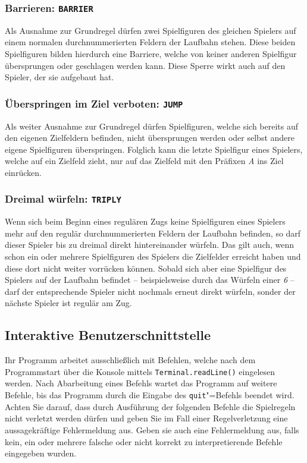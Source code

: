 \subsubsection*{Barrieren: \texttt{BARRIER}} 
Als Ausnahme zur Grundregel dürfen zwei Spielfiguren des gleichen Spielers auf einem normalen durchnummerierten Feldern der Laufbahn stehen. Diese beiden Spielfiguren bilden hierdurch eine Barriere, welche von keiner anderen Spielfigur übersprungen oder geschlagen werden kann. Diese Sperre wirkt auch auf den Spieler, der sie aufgebaut hat.

\subsubsection*{Überspringen im Ziel verboten: \texttt{JUMP}} 
Als weiter Ausnahme zur Grundregel dürfen Spielfiguren, welche sich bereits auf den eigenen Zielfeldern befinden, nicht übersprungen werden oder selbst andere eigene Spielfiguren überspringen. Folglich kann die letzte Spielfigur eines Spielers, welche auf ein Zielfeld zieht, nur auf das Zielfeld mit den Präfixen \emph{A} ins Ziel einrücken.

\subsubsection*{Dreimal würfeln: \texttt{TRIPLY}}
Wenn sich beim Beginn eines regulären Zugs keine Spielfiguren eines Spielers mehr auf den regulär durchnummerierten Feldern der Laufbahn befinden, so darf dieser Spieler bis zu dreimal direkt hintereinander würfeln. Das gilt auch, wenn schon ein oder mehrere Spielfiguren des Spielers die Zielfelder erreicht haben und diese dort nicht weiter vorrücken können. Sobald sich aber eine Spielfigur des Spielers auf der Laufbahn befindet -- beispielsweise durch das Würfeln einer \emph{6} -- darf der entsprechende Spieler nicht nochmals erneut direkt würfeln, sonder der nächste Spieler ist regulär am Zug.

\subsection*{Interaktive Benutzerschnittstelle}
Ihr Programm arbeitet ausschließlich mit Befehlen, welche nach dem Programmstart über die Konsole mittels \texttt{Terminal.readLine()} eingelesen werden. Nach Abarbeitung eines Befehls wartet das Programm auf weitere Befehle, bis das Programm durch die Eingabe des \texttt{quit}"=Befehls beendet wird. Achten Sie darauf, dass durch Ausführung der folgenden Befehle die Spielregeln nicht verletzt werden dürfen und geben Sie im Fall einer Regelverletzung eine aussagekräftige Fehlermeldung aus. Geben sie auch eine Fehlermeldung aus, falls kein, ein oder mehrere falsche oder nicht korrekt zu interpretierende Befehle eingegeben wurden.


